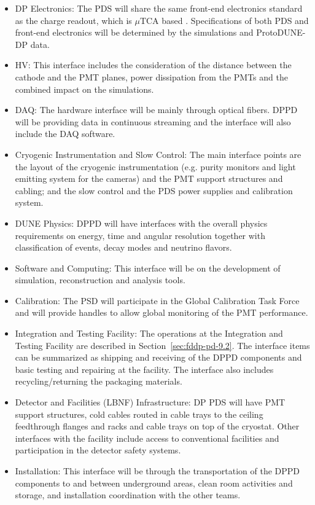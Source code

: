 \begin{itemize}

\item DP Electronics: The PDS will share the same front-end electronics standard as the charge readout, which is $\mu$TCA based \cite{utca}. Specifications of both PDS and front-end electronics will be determined by the simulations and ProtoDUNE-DP data.

\item HV: This interface includes the consideration of the distance between the cathode and the PMT planes, power dissipation from the PMTs and the combined impact on the simulations.

\item DAQ: The hardware interface will be mainly through optical fibers. DPPD will be providing data in continuous streaming and the interface will also include the DAQ software.

\item Cryogenic Instrumentation and Slow Control: The main interface points are the layout of the cryogenic instrumentation (e.g. purity monitors and light emitting system for the cameras) and the PMT support structures and cabling; and the slow control and the PDS power supplies and calibration system.

\item DUNE Physics: DPPD will have interfaces with the overall physics requirements on energy, time and angular resolution together with classification of events, decay modes and neutrino flavors.

\item Software and Computing: This interface will be on the development of simulation, reconstruction and analysis tools.

\item Calibration: The PSD will participate in the Global Calibration Task Force and will provide handles to allow global monitoring of the PMT performance.

\item Integration and Testing Facility: The operations at the Integration and Testing Facility are described in Section~\ref{sec:fddp-pd-9.2}. The interface items can be summarized as shipping and receiving of the DPPD components and basic testing and repairing at the facility. The interface also includes recycling/returning the packaging materials.

\item Detector and Facilities (LBNF) Infrastructure: DP PDS will have PMT support structures, cold cables routed in cable trays to the ceiling feedthrough flanges and racks and cable trays on top of the cryostat. Other interfaces with the facility include access to conventional facilities and participation in the detector safety systems. 

\item Installation: This interface will be through the transportation of the DPPD components to and between underground areas, clean room activities and storage, and installation coordination with the other teams. 

\end{itemize}

